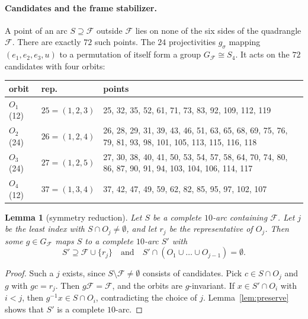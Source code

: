 \documentclass[11pt]{article}
\newtheorem{lemma}[theorem]{Lemma}
\theoremstyle{definition}
\theoremstyle{remark}
\begin{document}
\paragraph{Candidates and the frame stabilizer.}
A point of an arc $S\supseteq\mathcal F$ outside $\mathcal F$ lies on none of
the six sides of the quadrangle $\mathcal F$. There are exactly $72$ such
points. The $24$ projectivities $g_\sigma$ mapping $(e_1,e_2,e_3,u)$ to a
permutation of itself form a group $G_{\mathcal F}\cong S_4$. It acts on the
$72$ candidates with four orbits:
\begin{center}\small
\begin{tabular}{@{}llp{}@{}}
\toprule
orbit & rep. & points\\
\midrule
$O_1$ (12) & $25=(1,2,3)$ & 25, 32, 35, 52, 61, 71, 73, 83, 92, 109, 112, 119\\
$O_2$ (24) & $26=(1,2,4)$ & 26, 28, 29, 31, 39, 43, 46, 51, 63, 65, 68, 69, 75, 76,
79, 81, 93, 98, 101, 105, 113, 115, 116, 118\\
$O_3$ (24) & $27=(1,2,5)$ & 27, 30, 38, 40, 41, 50, 53, 54, 57, 58, 64, 70, 74, 80,
86, 87, 90, 91, 94, 103, 104, 106, 114, 117\\
$O_4$ (12) & $37=(1,3,4)$ & 37, 42, 47, 49, 59, 62, 82, 85, 95, 97, 102, 107\\
\bottomrule
\end{tabular}
\end{center}

\begin{lemma}[symmetry reduction]\label{lem:reduce}
Let $S$ be a complete $10$-arc containing $\mathcal F$. Let $j$ be the least
index with $S\cap O_j\neq\emptyset$, and let $r_j$ be the representative of
$O_j$. Then some $g\in G_{\mathcal F}$ maps $S$ to a complete $10$-arc $S'$
with
\[
S'\supseteq\mathcal F\cup\{r_j\}\quad\text{and}\quad
S'\cap(O_1\cup\dots\cup O_{j-1})=\emptyset .
\]
\end{lemma}
\begin{proof}
Such a $j$ exists, since $S\setminus\mathcal F\neq\emptyset$ consists of
candidates. Pick $c\in S\cap O_j$ and $g$ with $gc=r_j$. Then $g\mathcal F=
\mathcal F$, and the orbits are $g$-invariant. If $x\in S'\cap O_i$ with $i<j$,
then $g^{-1}x\in S\cap O_i$, contradicting the choice of $j$.
Lemma~\ref{lem:preserve} shows that $S'$ is a complete $10$-arc.
\end{proof}
\end{document}
